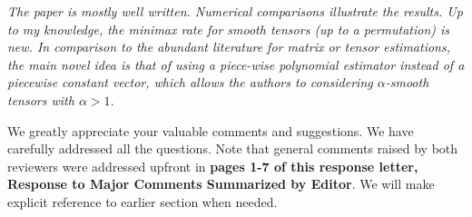 \documentclass[11pt]{article}
\theoremstyle{plain}
\theoremstyle{definition}
\begin{document}
\emph{The paper is mostly well written. Numerical comparisons illustrate the results. Up to my knowledge, the minimax rate for smooth tensors (up to a permutation) is new. In comparison to the abundant literature for matrix or tensor estimations, the main novel idea is that of using a piece-wise polynomial estimator instead of a piecewise constant vector, which allows the authors to considering $\alpha$-smooth tensors with $\alpha > 1$.}

We greatly appreciate your valuable comments and suggestions. We have carefully addressed all the questions. Note that general comments raised by both reviewers were addressed upfront in {\bf pages 1-7 of this response letter, Response to Major Comments Summarized by Editor}. We will make explicit reference to earlier section when needed. 
\end{document}

